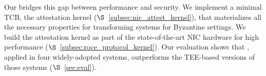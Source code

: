 


 Our \projecttitle{} bridges this gap between performance and security. We implement a minimal TCB, the attestation kernel ($\S$~\ref{subsec:nic_attest_kernel}), that materializes all the necessary properties for transforming systems for Byzantine settings. We build the attestation kernel as part of the state-of-the-art NIC hardware for high performance ($\S$~\ref{subsec:roce_protocol_kernel}). Our evaluation shows that \projecttitle{}, applied in four widely-adopted systems, outperforms the TEE-based versions of those systems ($\S$~\ref{sec:eval}).



